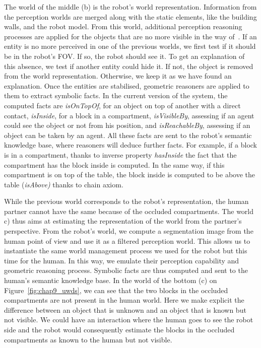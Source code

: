 The world of the middle (b) is the robot's world representation. Information from the perception worlds are merged along with the static elements, like the building walls, and the robot model. From this world, additional perception reasoning processes are applied for the objects that are no more visible in the way of~\cite{milliez_2014_framework}. If an entity is no more perceived in one of the previous worlds, we first test if it should be in the robot's FOV. If so, the robot should see it. To get an explanation of this absence, we test if another entity could hide it. If not, the object is removed from the world representation. Otherwise, we keep it as we have found an explanation.
Once the entities are stabilised, geometric reasoners are applied to them to extract symbolic facts. In the current version of the system, the computed facts are \textit{isOnTopOf}, for an object on top of another with a direct contact, \textit{isInside}, for a block in a compartment, \textit{isVisibleBy}, assessing if an agent could see the object or not from his position, and \textit{isReachableBy}, assessing if an object can be taken by an agent. All these facts are sent to the robot's semantic knowledge base, where reasoners will deduce further facts. For example, if a block is in a compartment, thanks to inverse property \textit{hasInside} the fact that the compartment has the block inside is computed. In the same way, if this compartment is on top of the table, the block inside is computed to be above the table (\textit{isAbove)} thanks to chain axiom.

While the previous world corresponds to the robot's representation, the human partner cannot have the same because of the occluded compartments. The world c) thus aims at estimating the representation of the world from the partner's perspective. From the robot's world, we compute a segmentation image from the human point of view and use it as a filtered perception world. This allows us to instantiate the same world management process we used for the robot but this time for the human. In this way, we emulate their perception capability and geometric reasoning process. Symbolic facts are thus computed and sent to the human's semantic knowledge base. In the world of the bottom (c) on Figure~\ref{fig:chap9_uwds}, we can see that the two blocks in the occluded compartments are not present in the human world. Here we make explicit the difference between an object that is unknown and an object that is known but not visible. We could have an interaction where the human goes to see the robot side and the robot would consequently estimate the blocks in the occluded compartments as known to the human but not visible.

